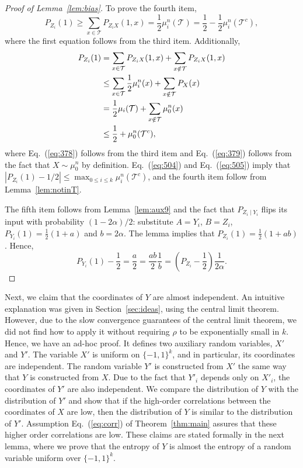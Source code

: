 \documentclass[final, 12pt]{colt2018}
\renewcommand{\eqref}[1]{Eq.~(\ref{#1})}
\newcommand{\lemref}[1]{Lemma~\ref{#1}}
\begin{document}
\begin{proof}[Proof of Lemma~\ref{lem:bias}]
To prove the fourth item,
\begin{equation}\label{eq:504}
P_{Z_i}(1)
\ge \sum_{x \in \mathcal{T}} P_{Z_i X} (1, x)
= \frac{1}{2} \mu_i^n(\mathcal{T})
= \frac{1}{2} - \frac{1}{2} \mu_i^n(\mathcal{T}^c),
\end{equation}
where the first equation follows from the third item. Additionally,
\begin{align}
P_{Z_i}(1) 
&= \sum_{x \in \mathcal{T}} P_{Z_i X} (1, x) + \sum_{x \notin \mathcal{T}} P_{Z_i X} (1, x) \notag\\
&\le \sum_{x \in \mathcal{T}}\frac{1}{2} \mu_i^n(x) 
+ \sum_{x \notin \mathcal{T}} P_{X}(x) \label{eq:378}\\
&= \frac{1}{2} \mu_i(\mathcal{T}) + \sum_{x \notin \mathcal{T}} \mu_0^n(x) \label{eq:379} \\
&\le \frac{1}{2} + \mu_0^n(\mathcal{T}^c), \label{eq:505}
\end{align}
where \eqref{eq:378} follows from the third item and \eqref{eq:379} follows from the fact that $X \sim \mu_0^n$ by definition. 
\eqref{eq:504} and \eqref{eq:505} imply that $\left\lvert P_{Z_i}(1)-1/2\right\rvert \le \max_{0\le i \le k} \mu_i^n\left( \mathcal{T}^c\right)$, and the fourth item follow from \lemref{lem:notinT}.

The fifth item follows from Lemma~\ref{lem:aux9} and the fact that $P_{Z_i \mid Y_i}$ flips its input with probability $(1-2\alpha)/2$: substitute $A=Y_i$, $B=Z_i$, $P_{Y_i}(1) = \frac{1}{2}(1+a)$ and $b = 2\alpha$. The lemma implies that $P_{Z_i}(1) = \frac{1}{2}(1+ab)$. Hence, 
\[
P_{Y_i}(1) - \frac{1}{2}
= \frac{a}{2}
= \frac{ab}{2} \frac{1}{b}
= \left( P_{Z_i} - \frac{1}{2} \right) \frac{1}{2\alpha}.
\]
\end{proof}

Next, we claim that the coordinates of $Y$ are almost independent. An intuitive explanation was given in Section~\ref{sec:ideas}, using the central limit theorem. However, due to the slow convergence guarantees of the central limit theorem, we did not find how to apply it without requiring $\rho$ to be exponentially small in $k$. Hence, we have an ad-hoc proof. It defines two auxiliary random variables, $X'$ and $Y'$. The variable $X'$ is uniform on $\{-1,1\}^k$, and in particular, its coordinates are independent. The random variable $Y'$ is constructed from $X'$ the same way that $Y$ is constructed from $X$. Due to the fact that $Y'_i$ depends only on $X'_i$, the coordinates of $Y'$ are also independent. We compare the distribution of $Y$ with the distribution of $Y'$ and show that if the high-order correlations between the coordinates of $X$ are low, then the distribution of $Y$ is similar to the distribution of $Y'$. Assumption \eqref{eq:corr} of Theorem~\ref{thm:main} assures that these higher order correlations are low. These claims are stated formally in the next lemma, where we prove that the entropy of $Y$ is almost the entropy of a random variable uniform over $\{-1,1\}^k$.
\end{document}
